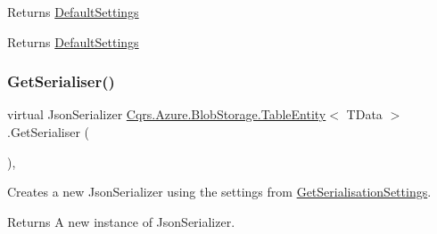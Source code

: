 Returns \hyperlink{classCqrs_1_1Azure_1_1BlobStorage_1_1TableEntity_ab7a9041c7d8e5237cfb81ad98b6b3980_ab7a9041c7d8e5237cfb81ad98b6b3980}{Default\+Settings} 

\begin{DoxyReturn}{Returns}
\hyperlink{classCqrs_1_1Azure_1_1BlobStorage_1_1TableEntity_ab7a9041c7d8e5237cfb81ad98b6b3980_ab7a9041c7d8e5237cfb81ad98b6b3980}{Default\+Settings}
\end{DoxyReturn}
\mbox{\label{classCqrs_1_1Azure_1_1BlobStorage_1_1TableEntity_a18d1b7ecf408a921cd0e2e6a8d0f6c74_a18d1b7ecf408a921cd0e2e6a8d0f6c74}} 
\subsubsection{\texorpdfstring{Get\+Serialiser()}{GetSerialiser()}}
{\footnotesize\ttfamily virtual Json\+Serializer \hyperlink{classCqrs_1_1Azure_1_1BlobStorage_1_1TableEntity}{Cqrs.\+Azure.\+Blob\+Storage.\+Table\+Entity}$<$ T\+Data $>$.Get\+Serialiser (\begin{DoxyParamCaption}{ }\end{DoxyParamCaption})\hspace{0.3cm}{\ttfamily [protected]}, {\ttfamily [virtual]}}



Creates a new Json\+Serializer using the settings from \hyperlink{classCqrs_1_1Azure_1_1BlobStorage_1_1TableEntity_aa36736f412df5a1667d7b0e5c0bd3035_aa36736f412df5a1667d7b0e5c0bd3035}{Get\+Serialisation\+Settings}. 

\begin{DoxyReturn}{Returns}
A new instance of Json\+Serializer.
\end{DoxyReturn}
\mbox{\label{classCqrs_1_1Azure_1_1BlobStorage_1_1TableEntity_af7467b1194756dd32029dc40f690c4ad_af7467b1194756dd32029dc40f690c4ad}} 
